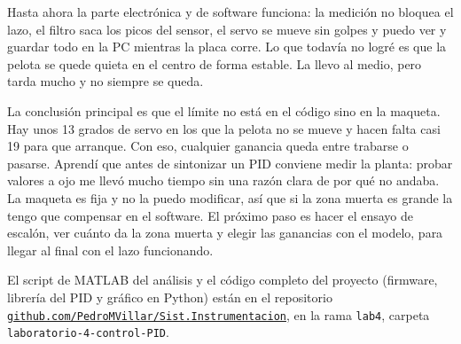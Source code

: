 \documentclass[11pt,a4paper]{article}
\begin{document}
Hasta ahora la parte electrónica y de software funciona: la medición no bloquea el lazo, el
filtro saca los picos del sensor, el servo se mueve sin golpes y puedo ver y guardar todo en
la PC mientras la placa corre. Lo que todavía no logré es que la pelota se quede quieta en el
centro de forma estable. La llevo al medio, pero tarda mucho y no siempre se queda.

La conclusión principal es que el límite no está en el código sino en la maqueta. Hay unos 13
grados de servo en los que la pelota no se mueve y hacen falta casi 19 para que arranque. Con
eso, cualquier ganancia queda entre trabarse o pasarse. Aprendí que antes de sintonizar un PID
conviene medir la planta: probar valores a ojo me llevó mucho tiempo sin una razón clara de por
qué no andaba. La maqueta es fija y no la puedo modificar, así que si la zona muerta es grande
la tengo que compensar en el software. El próximo paso es hacer el ensayo de escalón, ver cuánto
da la zona muerta y elegir las ganancias con el modelo, para llegar al final con el lazo
funcionando.

\vspace{6pt}
\noindent El script de MATLAB del análisis y el código completo del proyecto (firmware, librería
del PID y gráfico en Python) están en el repositorio
\href{https://github.com/PedroMVillar/Sist.Instrumentacion/tree/lab4/laboratorio-4-control-PID}{\texttt{github.com/PedroMVillar/Sist.Instrumentacion}},
en la rama \texttt{lab4}, carpeta \texttt{laboratorio-4-control-PID}.
\end{document}
